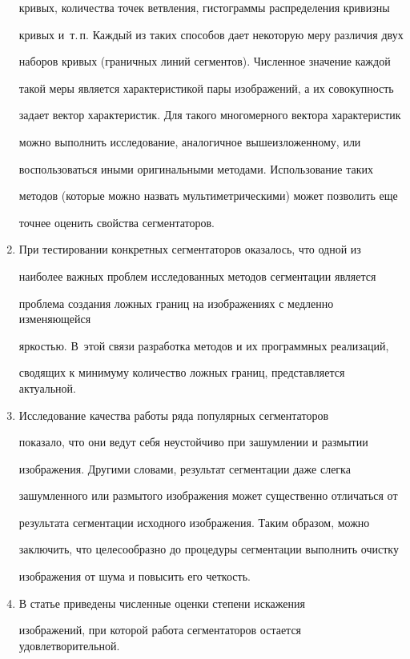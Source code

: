 \begin{multicols}{2}
\begin{enumerate}[1.]
кривых, количества точек ветвления, гистограммы распределения кривизны 


кривых и~т.\,п. Каждый из таких способов дает некоторую меру различия двух 


наборов кривых (граничных линий сегментов). Численное значение каждой 


такой меры является характеристикой пары изображений, а их совокупность 


задает вектор характеристик. Для такого многомерного вектора характеристик 


можно выполнить исследование, аналогичное вышеизложенному, или 


воспользоваться иными оригинальными методами. Использование таких 


методов (которые можно назвать мультиметрическими) может позволить еще 


точнее оценить свойства сегментаторов.


  \item  При тестировании конкретных сегментаторов оказалось, что одной из 


наиболее важных проблем исследованных методов сегментации является 


проблема создания ложных границ на изображениях с медленно изменяющейся 


яркостью. В~этой связи разработка методов и их программных реализаций, 


сводящих к минимуму количество ложных границ, представляется актуальной.


  \item  Исследование качества работы ряда популярных сегментаторов 


показало, что они ведут себя неустойчиво при зашумлении и размытии 


изоб\-ра\-же\-ния. Другими словами, результат сегментации даже слегка 


зашумленного или размытого изображения может существенно отличаться от 


результата сегментации исходного изображения. Таким образом, можно 


заключить, что целесообразно до процедуры сегментации выполнить очистку 


изображения от шума и повысить его четкость.


  \item  В статье приведены численные оценки степени искажения 


изображений, при которой работа сегментаторов остается удовлетворительной. 



\end{enumerate}
\end{multicols}
